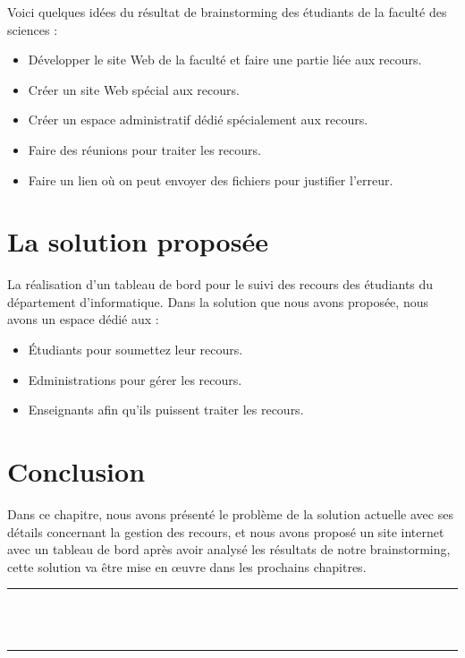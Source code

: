 \documentclass[12pt]{report}
\begin{document}
Voici quelques idées du résultat de brainstorming des étudiants de la faculté des sciences :
\begin{itemize}
    \item Développer le site Web de la faculté et faire une partie liée aux recours.
    \item Créer un site Web spécial aux recours.
    \item Créer un espace administratif dédié spécialement aux recours.
    \item Faire des réunions pour traiter les recours.
    \item Faire un lien où on peut envoyer des fichiers pour justifier l'erreur.
\end{itemize}

\section{La solution proposée}
La réalisation d’un tableau de bord pour le suivi des recours des étudiants du département d’informatique. Dans la solution que nous avons proposée, nous avons un espace dédié aux :
\begin{itemize}
    \item Étudiants pour soumettez leur recours.
    \item Edministrations pour gérer les recours.
    \item Enseignants afin qu’ils puissent traiter les recours.
\end{itemize}

\section{Conclusion}
Dans ce chapitre, nous avons présenté le problème de la solution actuelle avec ses détails concernant la gestion des recours, et nous avons proposé un site internet avec un tableau de bord après avoir analysé les résultats de notre brainstorming, cette solution va être mise en œuvre dans les prochains chapitres.

\newpage

\vspace*{\fill}
\begin{center}
    {\color{Blue} \rule{\linewidth}{1.2mm} }\\
\vspace{0.25in}
    {\centering{}}
\vspace{0.35in}\\
    {\color{Blue} \rule{\linewidth}{1.2mm} }
\end{center}
\vspace*{\fill}
\setcounter{section}{0}
\end{document}
